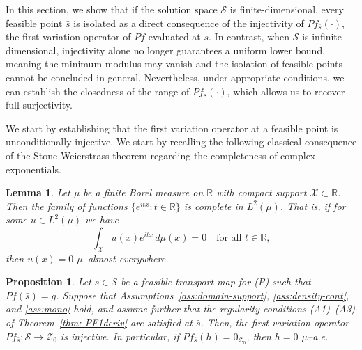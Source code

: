 \documentclass[12pt,leqno]{amsart}
\newtheorem{lemma}{Lemma}
\newtheorem{proposition}{Proposition}
\begin{document}
In this section, we show that if the solution space $\mathcal{S}$ is finite-dimensional, every feasible point $\bar{s}$ is isolated as a direct consequence of the injectivity of $Pf_{\bar{s}}(\cdot)$, the first variation operator of $Pf$ evaluated at $\bar{s}$. In contrast, when $\mathcal{S}$ is infinite-dimensional, injectivity alone no longer guarantees a uniform lower bound, meaning the minimum modulus may vanish and the isolation of feasible points cannot be concluded in general. Nevertheless, under appropriate conditions, we can establish the closedness of the range of $Pf_{\bar{s}}(\cdot)$, which allows us to recover full surjectivity.

We start by establishing that the first variation operator at a feasible point is unconditionally injective. We start by recalling the following classical consequence of the Stone-Weierstrass theorem regarding the completeness of complex exponentials.
\begin{lemma}\label{lem:completeness}
Let $\mu$ be a finite Borel measure on $\mathbb{R}$ with compact support $\mathcal{X} \subset \mathbb{R}$. Then the family of functions $\{e^{itx} : t \in \mathbb{R}\}$ is complete in $L^2(\mu)$. That is, if for some $u\in L^2(\mu)$ we have
\[ \int_{\mathcal{X}} u(x) e^{itx} \, d\mu(x) = 0 \quad \text{for all } t \in \mathbb{R}, \]
then $u(x) = 0$ $\mu$--almost everywhere.
\end{lemma}
\begin{proposition}\label{prop:injective}
Let $\bar{s} \in \mathcal{S}$ be a feasible transport map for (P) such that $Pf(\bar{s})=g$. Suppose that Assumptions~\ref{ass:domain-support}, \ref{ass:density-cont}, and \ref{ass:mono} hold, and assume further that the regularity conditions \emph{(A1)--(A3)} of Theorem~\ref{thm: PF1deriv} are satisfied at $\bar{s}$. Then, the first variation operator $Pf_{\bar{s}}: \mathcal{S} \to \mathcal{Z}_0$ is injective. In particular, if $Pf_{\bar{s}}(h) = 0_{\mathcal{Z}_0}$, then $h = 0$ $\mu$--a.e.
\end{proposition}
\end{document}
